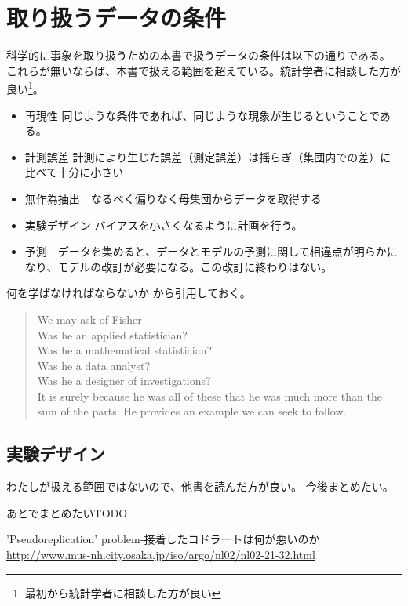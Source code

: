 \chapter{取り扱うデータの条件}
科学的に事象を取り扱うための本書で扱うデータの条件は以下の通りである。
これらが無いならば、本書で扱える範囲を超えている。統計学者に相談した方が良い\footnote{最初から統計学者に相談した方が良い}。

\begin{itemize}
    \item 再現性 同じような条件であれば、同じような現象が生じるということである。
    \item 計測誤差  計測により生じた誤差（測定誤差）は揺らぎ（集団内での差）に比べて十分に小さい
    \item 無作為抽出　なるべく偏りなく母集団からデータを取得する%
    \item 実験デザイン バイアスを小さくなるように計画を行う。
    \item 予測　データを集めると、データとモデルの予測に関して相違点が明らかになり、モデルの改訂が必要になる。この改訂に終わりはない。
\end{itemize}


\begin{SMbox}{何を学ばなければならないか}
    \cite{box1976science}から引用しておく。
    \begin{quote}
        We may ask of Fisher \\
        Was he an applied statistician? \\
        Was he a mathematical statistician?  \\
        Was he a data analyst? \\
        Was he a designer of investigations?\\
        It is surely because he was all of these that he was much more than the sum of the parts. He provides an example we can seek to follow. 
    \end{quote}
\end{SMbox}

\section{実験デザイン}
わたしが扱える範囲ではないので、他書を読んだ方が良い。
今後まとめたい。
\begin{SMbox}{あとでまとめたいTODO}

    'Pseudoreplication' problem‐接着したコドラートは何が悪いのか
 \url{http://www.mus-nh.city.osaka.jp/iso/argo/nl02/nl02-21-32.html}
\end{SMbox}

